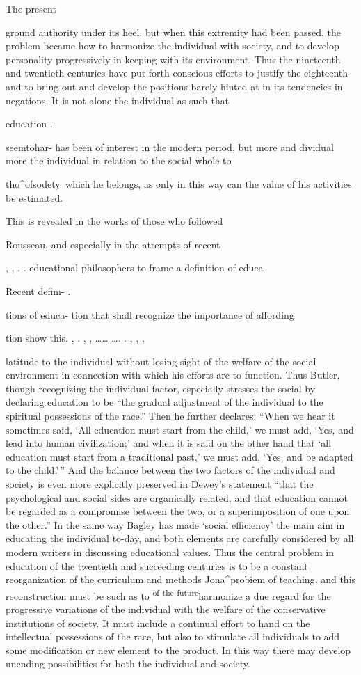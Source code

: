\documentclass[
]{book}
\begin{document}
The present

ground authority under its heel, but when this extremity had been passed, the problem became how to harmonize the individual with society, and to develop personality progressively in keeping with its environment. Thus the nineteenth and twentieth centuries have put forth conscious efforts to justify the eighteenth and to bring out and develop the positions barely hinted at in its tendencies in negations. It is not alone the individual as such that

education .

seemtohar- has been of interest in the modern period, but more and dividual more the individual in relation to the social whole to

tho\^{}ofsodety. which he belongs, as only in this way can the value of his activities be estimated.

This is revealed in the works of those who followed

Rousseau, and especially in the attempts of recent

, , . . educational philosophers to frame a definition of educa

Recent defim- .

tions of educa- tion that shall recognize the importance of affording

tion show this. , . , , \ldots\ldots{} \ldots. . , , ,

latitude to the individual without losing sight of the welfare of the social environment in connection with which his efforts are to function. Thus Butler, though recognizing the individual factor, especially stresses the social by declaring education to be ``the gradual adjustment of the individual to the spiritual possessions of the race.'' Then he further declares: ``When we hear it sometimes said, `All education must start from the child,' we must add, `Yes, and lead into human civilization;' and when it is said on the other hand that `all education must start from a traditional past,' we must add, `Yes, and be adapted to the child.'\,'' And the balance between the two factors of the individual and society is even more explicitly preserved in Dewey's statement ``that the psychological and social sides are organically related, and that education cannot be regarded as a compromise between the two, or a superimposition of one upon the other.'' In the same way Bagley has made `social efficiency' the main aim in educating the individual to-day, and both elements are carefully considered by all modern writers in discussing educational values. Thus the central problem in education of the twentieth and succeeding centuries is to be a constant reorganization of the curriculum and methods Jona\^{}probiem of teaching, and this reconstruction must be such as to \textsuperscript{of} \textsuperscript{the} \textsuperscript{future}harmonize a due regard for the progressive variations of the individual with the welfare of the conservative institutions of society. It must include a continual effort to hand on the intellectual possessions of the race, but also to stimulate all individuals to add some modification or new element to the product. In this way there may develop unending possibilities for both the individual and society.
\end{document}
